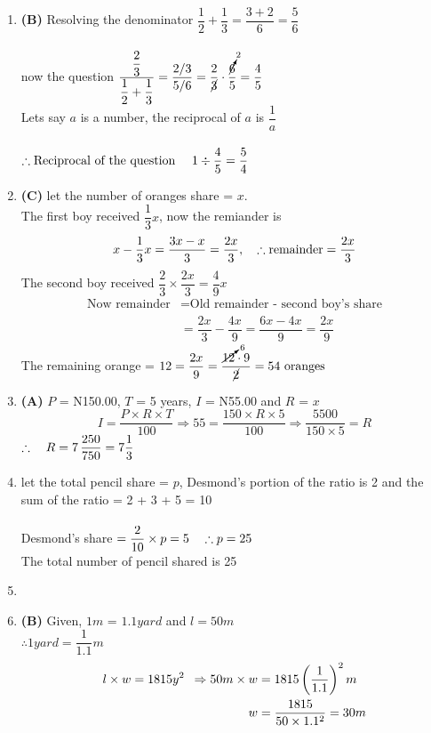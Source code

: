 \begin{multicols}{2}
\begin{enumerate}[label={\textbf{\arabic*.}}]
    \item \textbf{(B)} Resolving the denominator $ \dfrac{1}{2} + \dfrac{1}{3} = \dfrac{3 + 2}{6} = \dfrac{5}{6}$  \\\\
    now the question $ \dfrac{\dfrac{2}{3}}{\dfrac{1}{2} + \dfrac{1}{3}} = \dfrac{2/3}{5/6} = \dfrac{2}{\cancel{3}} \cdot \dfrac{\cancelto{2}{6}}{5} = \dfrac{4}{5}$ \\
    Lets say $a$ is a number, the reciprocal of $a$ is $\dfrac{1}{a}$ \\\\
    $\therefore \text{Reciprocal of the question } \hspace{10px} 1 \divisionsymbol \dfrac{4}{5} = \dfrac{5}{4}$

    \item \textbf{(C)} let the number of oranges share =  $x$. \\
    The first boy received $\dfrac{1}{3}x$, now the remiander is \\ 
    \[x - \dfrac{1}{3}x = \dfrac{3x - x }{3} = \dfrac{2x}{3}, \hspace{10px} \therefore \text{remainder} = \dfrac{2x}{3}\]
    The second boy received $\dfrac{2}{3} \times \dfrac{2x}{3} = \dfrac{4}{9}x$ 
    \begin{align*}
    \text{Now remainder} &= \text{Old remainder - second boy's share} \\
    &= \dfrac{2x}{3} - \dfrac{4x}{9} = \dfrac{6x - 4x}{9} = \dfrac{2x}{9}
    \end{align*}
    The remaining orange = $12 = \dfrac{2x}{9} = \dfrac{\cancelto{6}{12} \cdot 9}{\cancel{2}} = 54 \text{ oranges } $
    \item \textbf{(A)} $P$ = N150.00, $T$ = 5 years, $I$ = N55.00 and $R$ = $x$ \\
    \[ I = \dfrac{P \times R \times T}{100} \Rightarrow 55 =  \dfrac{150 \times R \times 5}{100} \Rightarrow \dfrac{5500}{150 \times 5} = R\]
    $ \therefore \hspace{10px} R = 7\,\dfrac{250}{750} = 7 \dfrac{1}{3} $
    
    \item let the total pencil share = $p$, Desmond's portion of the ratio is 2 and the sum of the ratio = 2 + 3 + 5 = 10 \\\\
    Desmond's share $ = \dfrac{2}{10} \times p = 5 \hspace{10px} \therefore p = 25$ \\
    The total number of pencil shared is 25
    \item 
    \item \textbf{(B)} Given, $1m$ = $1.1yard$ and $ l = 50m $  \\
    $\therefore 1 yard = \dfrac{1}{1.1}m $
    \begin{align*}
         l \times w = 1815y^2 \hspace{5px} \Rightarrow
         50m \times w &= 1815\left(\dfrac{1}{1.1}\right)^2m \\
         w &= \dfrac{1815}{50 \times 1.1^2} = 30m 
    \end{align*}


\end{enumerate}
\end{multicols}
